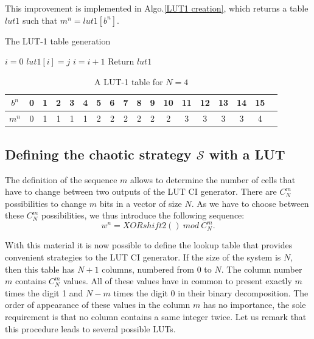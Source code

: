 This improvement is implemented in Algo.\ref{LUT1 creation}, 
which returns a table $lut1$ such that $m^n=lut1[b^n]$.

\begin{algorithm}
\caption{The LUT-1 table generation}\label{LUT1 creation}
\begin{algorithmic}[1]

        \STATE $i=0$
             \STATE $lut1[i]=j$
             \STATE $i=i+1$
         \ENDWHILE
    \ENDFOR
\STATE Return $lut1$
\end{algorithmic}
\end{algorithm}

\begin{table} 
\renewcommand{\arraystretch}{1.3}
\caption{A LUT-1 table for $N=4$}
\label{LUT1 for example}
\centering
  \begin{tabular}{|c|c|c|c|c|c|c|c|c|c|c|c|c|c|c|c|c|c|}
    \hline
 $b^n$  & 0 & 1 & 2 & 3 & 4 & 5 & 6 & 7 &8 &9 &10 &11 &12 &13 &14 &15\\ \hline\hline
 $m^n$ & 0 & 1 & 1 & 1 & 1 & 2 & 2 & 2 & 2 & 2 & 2 & 3 & 3 &3 & 3 &4 \\ \hline

  \end{tabular}
\end{table}


\subsection{Defining the chaotic strategy $\mathcal{S}$ with a LUT}
\label {LUT2}
The definition of the sequence $m$ allows to determine the number of cells 
that have to change between two outputs of the LUT CI generator.
There are $C_N^m$ possibilities to change $m$ bits in a vector of size $N$.
As we have to choose between these $C_N^m$ possibilities, we thus introduce the following sequence:
\begin{equation}
w^n=XORshift2()~mod~C^m_N.
\end{equation}

With this material it is now possible to define the lookup table that provides convenient strategies to the LUT CI generator.
If the size of the system is $N$, then this table has $N+1$ columns, numbered from 0 to $N$.
The column number $m$ contains $C_N^m$ values.
All of these values have in common to present exactly $m$ times the digit 1 
and $N-m$ times the digit 0 in their binary decomposition.
The order of appearance of these values in the column $m$ has no importance, 
the sole requirement is that no column contains a same integer twice.
Let us remark that this procedure leads to several possible LUTs.

